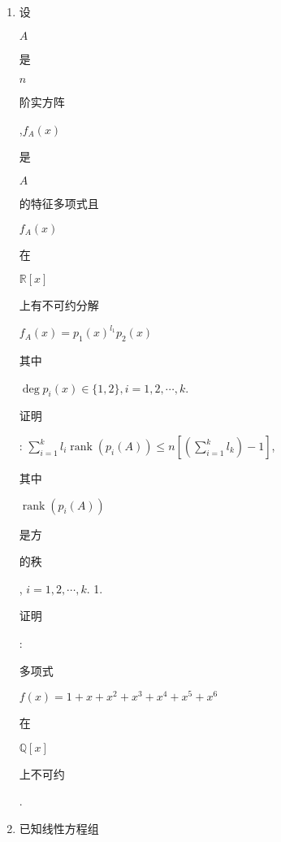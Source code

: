 \documentclass[10pt]{article}
\begin{document}
\begin{enumerate}
  \item \begin{CJK}{UTF8}{mj}设\end{CJK} $A$ \begin{CJK}{UTF8}{mj}是\end{CJK} $n$ \begin{CJK}{UTF8}{mj}阶实方阵\end{CJK},$f_{A}(x)$ \begin{CJK}{UTF8}{mj}是\end{CJK} $A$ \begin{CJK}{UTF8}{mj}的特征多项式且\end{CJK} $f_{A}(x)$ \begin{CJK}{UTF8}{mj}在\end{CJK} $\mathbb{R}[x]$ \begin{CJK}{UTF8}{mj}上有不可约分解\end{CJK} $f_{A}(x)=p_{1}(x)^{l_{1}} p_{2}(x)$ \begin{CJK}{UTF8}{mj}其中\end{CJK} $\operatorname{deg} p_{i}(x) \in\{1,2\}, i=1,2, \cdots, k$. \begin{CJK}{UTF8}{mj}证明\end{CJK}: $\sum_{i=1}^{k} l_{i} \operatorname{rank}\left(p_{i}(A)\right) \leq n\left[\left(\sum_{i=1}^{k} l_{k}\right)-1\right]$, \begin{CJK}{UTF8}{mj}其中\end{CJK} $\operatorname{rank}\left(p_{i}(A)\right)$ \begin{CJK}{UTF8}{mj}是方\end{CJK} \begin{CJK}{UTF8}{mj}的秩\end{CJK}, $i=1,2, \cdots, k$. 1. \begin{CJK}{UTF8}{mj}证明\end{CJK}: \begin{CJK}{UTF8}{mj}多项式\end{CJK} $f(x)=1+x+x^{2}+x^{3}+x^{4}+x^{5}+x^{6}$ \begin{CJK}{UTF8}{mj}在\end{CJK} $\mathbb{Q}[x]$ \begin{CJK}{UTF8}{mj}上不可约\end{CJK}.

  \item \begin{CJK}{UTF8}{mj}已知线性方程组\end{CJK}

\end{enumerate}
\end{document}
